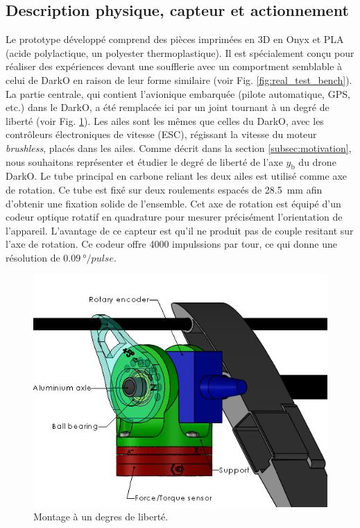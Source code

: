 \subsection{Description physique, capteur et actionnement}
Le prototype développé comprend des pièces imprimées en 3D en Onyx et PLA (acide polylactique, un polyester thermoplastique). Il est spécialement conçu pour réaliser des expériences devant une soufflerie avec un comportment semblable à celui de DarkO en raison de leur forme similaire (voir Fig. \ref{fig:real_test_bench}). La partie centrale, qui contient l'avionique embarquée (pilote automatique, GPS, etc.) dans le DarkO, a été remplacée ici par un joint tournant à un degré de liberté (voir Fig. \ref{fig:rotation}). Les ailes sont les mêmes que celles du DarkO, avec les contrôleurs électroniques de vitesse (ESC), régissant la vitesse du moteur \textit{brushless}, placés dans les ailes. Comme décrit dans la section \ref{subsec:motivation}, nous souhaitons représenter et étudier le degré de liberté de l'axe $y_{\text{b}}$ du drone DarkO. Le tube principal en carbone reliant les deux ailes est utilisé comme axe de rotation. Ce tube est fixé sur deux roulements espacés de \SI{28.5}{\milli\meter} afin d'obtenir une fixation solide de l'ensemble. Cet axe de rotation est équipé d'un codeur optique rotatif en quadrature pour mesurer précisément l'orientation de l'appareil. L'avantage de ce capteur est qu'il ne produit pas de couple resitant sur l'axe de rotation. Ce codeur offre 4000 impulssions par tour, ce qui donne une résolution de $\SI{0.09}{\degree}/pulse$.
\begin{figure}[!ht]
    \centering
    \includegraphics[width=0.8\columnwidth]{figures/MontageSupport2.PNG}
    \caption{Montage à un degres de liberté.}
    \label{fig:rotation}
\end{figure} 

